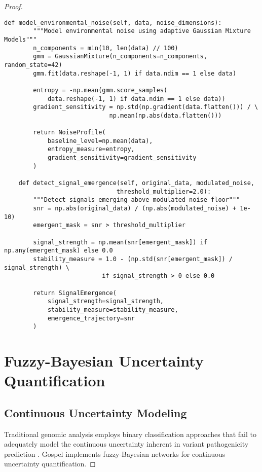 \documentclass[12pt,a4paper]{article}
\begin{document}
\begin{proof}
\begin{lstlisting}[style=pythonstyle, caption=Environmental Gradient Search Implementation]
    def model_environmental_noise(self, data, noise_dimensions):
        """Model environmental noise using adaptive Gaussian Mixture Models"""
        n_components = min(10, len(data) // 100)
        gmm = GaussianMixture(n_components=n_components, random_state=42)
        gmm.fit(data.reshape(-1, 1) if data.ndim == 1 else data)
        
        entropy = -np.mean(gmm.score_samples(
            data.reshape(-1, 1) if data.ndim == 1 else data))
        gradient_sensitivity = np.std(np.gradient(data.flatten())) / \
                             np.mean(np.abs(data.flatten()))
        
        return NoiseProfile(
            baseline_level=np.mean(data),
            entropy_measure=entropy,
            gradient_sensitivity=gradient_sensitivity
        )
    
    def detect_signal_emergence(self, original_data, modulated_noise, 
                               threshold_multiplier=2.0):
        """Detect signals emerging above modulated noise floor"""
        snr = np.abs(original_data) / (np.abs(modulated_noise) + 1e-10)
        emergent_mask = snr > threshold_multiplier
        
        signal_strength = np.mean(snr[emergent_mask]) if np.any(emergent_mask) else 0.0
        stability_measure = 1.0 - (np.std(snr[emergent_mask]) / signal_strength) \
                           if signal_strength > 0 else 0.0
        
        return SignalEmergence(
            signal_strength=signal_strength,
            stability_measure=stability_measure,
            emergence_trajectory=snr
        )
\end{lstlisting}

\section{Fuzzy-Bayesian Uncertainty Quantification}

\subsection{Continuous Uncertainty Modeling}

Traditional genomic analysis employs binary classification approaches that fail to adequately model the continuous uncertainty inherent in variant pathogenicity prediction \cite{richards2015standards, landrum2018clinvar}. Gospel implements fuzzy-Bayesian networks for continuous uncertainty quantification.


\end{proof}
\end{document}
